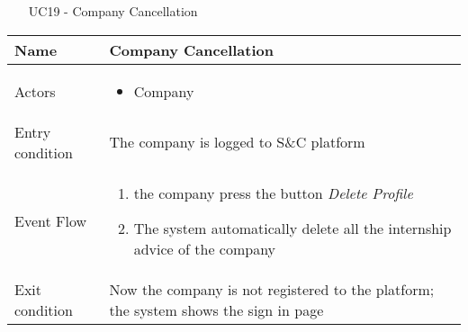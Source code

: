 					\begin{table} [H]
					\centering
					\begin{itemize}
						\item [UC19] - Company Cancellation
					\end{itemize}
					
					\begin{tabular}{|| P{7.5cm} | P{7.5cm} ||}
						\hline
						Name & Company Cancellation \\
						\hline
						Actors & \parbox{5cm}{\begin{itemize}
								\item Company
							\end{itemize}
						} \\
						\hline
						Entry condition & The company is logged to S\&C platform \\
						\hline
						Event Flow & \parbox{5cm}{\begin{enumerate}[label=\alpha]
								\item the company press the button \textit{Delete Profile}
								\item The system automatically delete 
								all the internship advice of the 
								company 
						\end{enumerate}} \\
						\hline 
						Exit condition & Now the company is not registered to 
						the platform; the system shows the sign
						in page  \\
						\hline
					\end{tabular}
				\end{table}
				
